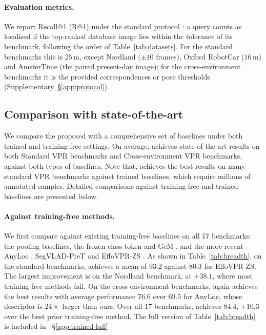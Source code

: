 \paragraph{Evaluation metrics.} We report Recall@1 (R@1) under the standard protocol \citep{netvlad,patchnetvlad}: a query counts as localised if the top-ranked database image lies within the tolerance of its benchmark, following the order of Table~\ref{tab:datasets}. For the standard benchmarks this is $25$\,m, except Nordland ($\pm10$ frames), Oxford RobotCar ($16$\,m) and AmsterTime (the paired present-day image); for the cross-environment benchmarks it is the provided correspondences or pose thresholds (Supplementary~\S\ref{app:protocol}).

\subsection{Comparison with state-of-the-art}
\label{sec:sota}
We compare the proposed \method{} with a comprehensive set of baselines under both trained and training-free settings. On average, \method{} achieves state-of-the-art results on both Standard VPR benchmarks and Cross-environment VPR benchmarks, against both types of baselines. Note that, \method{} achieves the best results on many standard VPR benchmarks against trained baselines, which require millions of annotated samples. Detailed comparisons against training-free and trained baselines are presented below.

\paragraph{Against training-free methods.} We first compare \method{} against existing training-free baselines on all 17 benchmarks: the pooling baselines, the frozen class token \citep{dinov2} and GeM \citep{gem}, and the more recent AnyLoc \citep{anyloc}, SegVLAD-PreT \citep{segvlad} and EffoVPR-ZS \citep{effovpr}. As shown in Table~\ref{tab:breadth}, on the standard benchmarks, \method{} achieves a mean of \textbf{$93.2$} against \textbf{$80.3$} for EffoVPR-ZS. The largest improvement is on the Nordland benchmark, at \textbf{$+38.1$}, where most training-free methods fail. On the cross-environment benchmarks, \method{} again achieves the best results with average performance \textbf{$76.6$} over \textbf{$69.5$} for AnyLoc, whose descriptor is $24\times$ larger than ours. Over all 17 benchmarks, \method{} achieves \textbf{$84.4$}, \textbf{$+10.3$} over the best prior training-free method. The full version of Table~\ref{tab:breadth} is included in ~\S\ref{app:trained-full}

